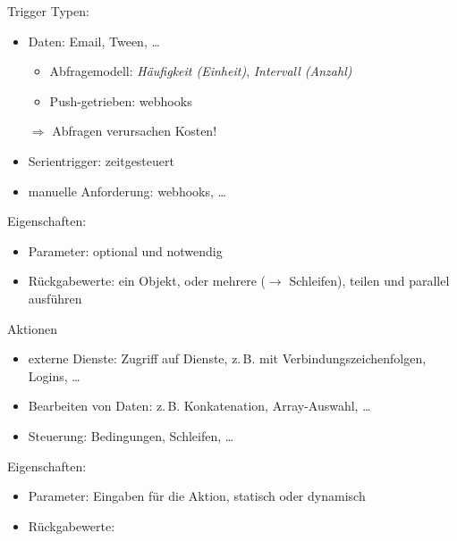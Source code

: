 \begin{flashcard}[Definition]{Trigger}
    Typen:
    \begin{itemize}
        \item Daten: Email, Tween, \ldots
            \begin{itemize}
                \item Abfragemodell: \emph{Häufigkeit (Einheit)}, \emph{Intervall (Anzahl)}
                \item Push-getrieben: webhooks
            \end{itemize}
            $\Rightarrow$ Abfragen verursachen Kosten!
        \item Serientrigger: zeitgesteuert
        \item manuelle Anforderung: webhooks, \ldots
    \end{itemize}
    Eigenschaften:
    \begin{itemize}
        \item Parameter: optional und notwendig
        \item Rückgabewerte: ein Objekt, oder mehrere ($\rightarrow$ Schleifen), teilen und parallel ausführen
    \end{itemize}

\end{flashcard}

\begin{flashcard}[Definition]{Aktionen}
    \begin{itemize}
        \item externe Dienste: Zugriff auf Dienste, z.\,B. mit Verbindungszeichenfolgen, Logins, \ldots
        \item Bearbeiten von Daten: z.\,B. Konkatenation, Array-Auswahl, \ldots
        \item Steuerung: Bedingungen, Schleifen, \ldots
    \end{itemize}
    \vspace{1cm}
    Eigenschaften:
    \begin{itemize}
        \item Parameter: Eingaben für die Aktion, statisch oder dynamisch
        \item Rückgabewerte:
    \end{itemize}
\end{flashcard}

